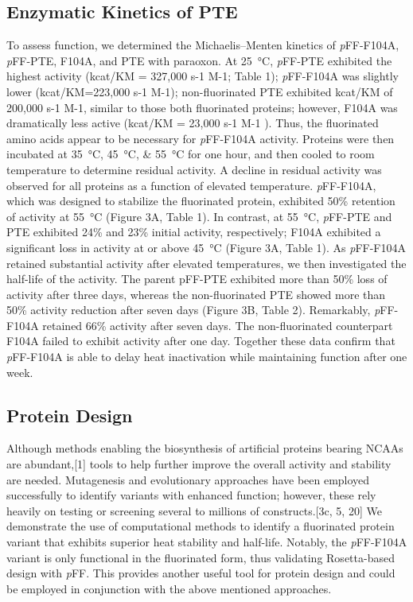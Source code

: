 \begin{refsection}
\subsection{Enzymatic Kinetics of PTE}
To assess function, we determined the Michaelis–Menten kinetics of
\emph{p}FF-F104A, \emph{p}FF-PTE, F104A, and PTE with paraoxon. At
\SI{25}{\celsius}, \emph{p}FF-PTE exhibited the highest activity (kcat/KM =
327,000 s-1 M-1; Table 1); \emph{p}FF-F104A was slightly lower (kcat/KM=223,000
s-1 M-1); non-fluorinated PTE exhibited kcat/KM of 200,000 s-1 M-1, similar to
those both fluorinated proteins; however, F104A was dramatically less active
(kcat/KM = 23,000 s-1 M-1 ). Thus, the fluorinated amino acids appear to be
necessary for \emph{p}FF-F104A activity. Proteins were then incubated at
\SIlist{35;45;55}{\celsius} for one hour, and then cooled to room temperature
to determine residual activity. A decline in residual activity was observed for
all proteins as a function of elevated temperature. \emph{p}FF-F104A, which was
designed to stabilize the fluorinated protein, exhibited 50\% retention of
activity at \SI{55}{\celsius} (Figure 3A, Table 1). In contrast, at
\SI{55}{\celsius}, \emph{p}FF-PTE and PTE exhibited 24\% and 23\% initial
activity, respectively; F104A exhibited a significant loss in activity at or
above \SI{45}{\celsius} (Figure 3A, Table 1). As \emph{p}FF-F104A retained
substantial activity after elevated temperatures, we then investigated the
half-life of the activity. The parent pFF-PTE exhibited more than 50\% loss of
activity after three days, whereas the non-fluorinated PTE showed more than
50\% activity reduction after seven days (Figure 3B, Table 2). Remarkably,
\emph{p}FF-F104A retained 66\% activity after seven days. The non-fluorinated
counterpart F104A failed to exhibit activity after one day. Together these data
confirm that \emph{p}FF-F104A is able to delay heat inactivation while
maintaining function after one week.

\subsection{Protein Design}

Although methods enabling the biosynthesis of artificial proteins bearing NCAAs
are abundant,[1] tools to help further improve the overall activity and
stability are needed. Mutagenesis and evolutionary approaches have been
employed successfully to identify variants with enhanced function; however,
these rely heavily on testing or screening several to millions of
constructs.[3c, 5, 20] We demonstrate the use of computational methods to
identify a fluorinated protein variant that exhibits superior heat stability
and half-life. Notably, the \emph{p}FF-F104A variant is only functional in the
fluorinated form, thus validating Rosetta-based design with \emph{p}FF. This
provides another useful tool for protein design and could be employed in
conjunction with the above mentioned approaches.

\printbibliography[heading=subbibliography]

\end{refsection}
